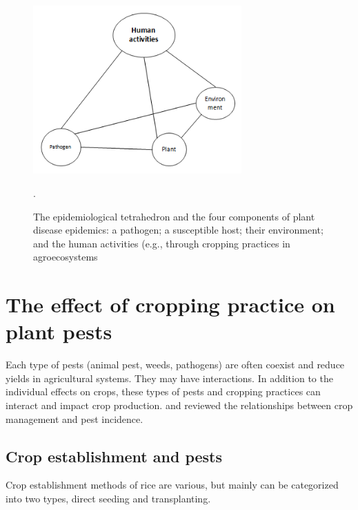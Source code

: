\documentclass[12pt, oneside]{report}
\begin{document}
\begin{figure}
\includegraphics[width=8cm]{distriangle}
\centering
\caption{The epidemiological tetrahedron and the four components of plant disease epidemics: a pathogen; a susceptible host; their environment; and the human activities (e.g., through cropping practices in agroecosystems}.
\label{fig:diseasetriangle}
\end{figure}

\section*{The effect of cropping practice on plant pests}

Each type of pests (animal pest, weeds, pathogens) are often coexist and reduce yields in agricultural systems. They may have interactions. In addition to the individual effects on crops, these types of pests and cropping practices can interact and impact crop production. \cite{ouricedisease, ho1994weed, cohen1998importance} and \cite{Mew:2004kh} reviewed the relationships between crop management and pest incidence. 

\subsection*{Crop establishment and pests}

Crop establishment methods of rice are various, but mainly can be categorized into two types, direct seeding and transplanting. 
\end{document}
